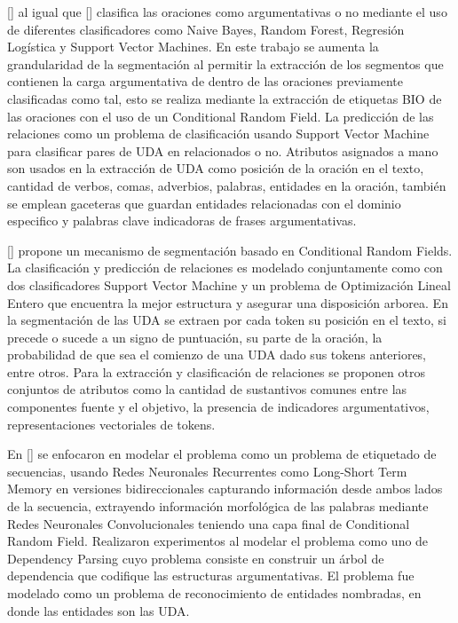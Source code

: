 [\cite{goudas2015argument}] al igual que [\cite{palau2009argumentation}] clasifica las oraciones como
argumentativas o no mediante el uso de diferentes clasificadores como Naive Bayes, Random Forest, Regresión
Logística y Support Vector Machines. En este trabajo se aumenta la grandularidad de la segmentación al permitir
la extracción de los segmentos que contienen la carga argumentativa de dentro de las oraciones previamente clasificadas
como tal, esto se realiza mediante la extracción de etiquetas BIO de las oraciones con el uso de un 
Conditional Random Field. La predicción de las relaciones como un problema de clasificación
usando Support Vector Machine para clasificar pares de UDA en relacionados o no. Atributos asignados a mano 
son usados en la extracción de UDA como posición de la oración en el texto, cantidad de verbos, comas, adverbios,
palabras, entidades en la oración, también se emplean gaceteras que guardan entidades relacionadas con el dominio 
especifico y palabras clave indicadoras de frases argumentativas. 

[\cite{stab2017parsing}] propone un mecanismo de segmentación basado en Conditional Random Fields. La clasificación
y predicción de relaciones es modelado conjuntamente como con dos clasificadores Support Vector Machine y un problema
de Optimización Lineal Entero que encuentra la mejor estructura y asegurar una disposición arborea. En la segmentación
de las UDA se extraen por cada token su posición en el texto, si precede o sucede a un signo de puntuación, su parte de
la oración, la probabilidad de que sea el comienzo de una UDA dado sus tokens anteriores, entre otros. Para la extracción
y clasificación de relaciones se proponen otros conjuntos de atributos como la cantidad de sustantivos comunes entre
las componentes fuente y el objetivo, la presencia de indicadores argumentativos, representaciones vectoriales de tokens.

En [\cite{eger2017neural}] se enfocaron en
modelar el problema como un problema de etiquetado de secuencias, usando Redes Neuronales Recurrentes como 
Long-Short Term Memory en versiones bidireccionales capturando información desde ambos lados de la secuencia,
extrayendo información morfológica de las palabras mediante Redes Neuronales Convolucionales teniendo una capa final de
Conditional Random Field. Realizaron experimentos al modelar el problema como uno de Dependency Parsing cuyo problema
consiste en construir un árbol de dependencia que codifique las estructuras argumentativas. El problema fue modelado
como un problema de reconocimiento de entidades nombradas, en donde las entidades son las UDA.

